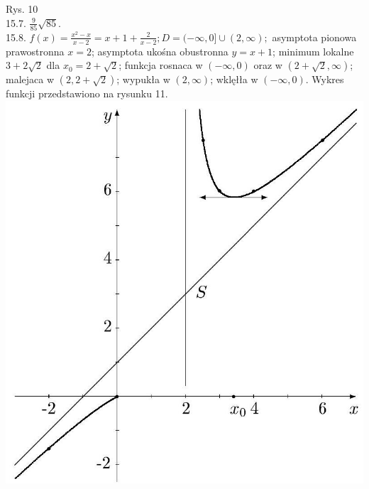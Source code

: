 \documentclass[10pt]{article}
\begin{document}
Rys. 10\\
15.7. $\frac{9}{85} \sqrt{85}$.\\
15.8. $f(x)=\frac{x^{2}-x}{x-2}=x+1+\frac{2}{x-2} ; D=(-\infty, 0] \cup(2, \infty) ;$ asymptota pionowa prawostronna $x=2$; asymptota ukośna obustronna $y=x+1$; minimum lokalne $3+2 \sqrt{2}$ dla $x_{0}=2+\sqrt{2}$; funkcja rosnaca w $(-\infty, 0)$ oraz w $(2+\sqrt{2}, \infty)$; malejaca w $(2,2+\sqrt{2})$; wypukła w $(2, \infty)$; wklęłła w $(-\infty, 0)$. Wykres funkcji przedstawiono na rysunku 11.\\
\includegraphics[max width=\textwidth, center]{2024_11_16_fe5b564401bf7db98894g-064}
\end{document}
